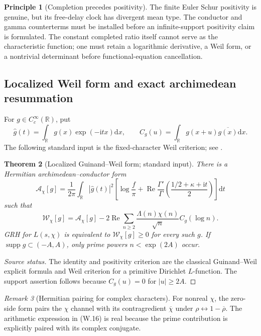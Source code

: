 \documentclass[11pt]{article}
\newtheorem{theorem}{Theorem}[section]
\theoremstyle{definition}
\newtheorem{principle}[theorem]{Principle}
\theoremstyle{remark}
\newtheorem{remark}[theorem]{Remark}
\newcommand{\R}{\mathbb R}
\newcommand{\supp}{\operatorname{supp}}
\newcommand{\dd}{\mathrm d}
\begin{document}
\begin{principle}[Completion precedes positivity]
The finite Euler Schur positivity is genuine, but its free-delay clock has
divergent mean type.  The conductor and gamma counterterms must be installed
before an infinite-support positivity claim is formulated.  The constant
completed ratio itself cannot serve as the characteristic function; one must
retain a logarithmic derivative, a Weil form, or a nontrivial determinant
before functional-equation cancellation.
\end{principle}

\subsection{Localized Weil form and exact archimedean resummation}

For $g\in C_c^\infty(\R)$, put
\[
 \widehat g(t)=\int_\R g(x)\exp(-\mathrm itx)\dd x,
 \qquad
 C_g(u)=\int_\R g(x+u)\overline{g(x)}\dd x.
\]
The following standard input is the fixed-character Weil criterion; see
\cite{Bombieri2000,Lagarias2004}.

\begin{theorem}[Localized Guinand--Weil form; standard input]
\label{thm:weil-explicit-form}
There is a Hermitian archimedean--conductor form
\[
 \mathcal A_\chi[g]
 =\frac1{2\pi}\int_\R|\widehat g(t)|^2
 \left[
  \log\frac f\pi
  +\operatorname{Re}\frac{\Gamma'}{\Gamma}
   \!\left(\frac{1/2+\kappa+\mathrm it}{2}\right)
 \right]\dd t
 \tag{W.15}
\]
such that
\[
 \boxed{
 \mathcal W_\chi[g]
 =\mathcal A_\chi[g]
 -2\operatorname{Re}\sum_{n\ge2}
  \frac{\Lambda(n)\chi(n)}{\sqrt n}C_g(\log n).}
 \tag{W.16}
\]
GRH for $L(s,\chi)$ is equivalent to
$\mathcal W_\chi[g]\ge0$ for every such $g$.  If
$\supp g\subset(-A,A)$, only prime powers $n<\exp(2A)$ occur.
\end{theorem}

\begin{proof}[Source status]
The identity and positivity criterion are the classical Guinand--Weil
explicit formula and Weil criterion for a primitive Dirichlet $L$-function.
The support assertion follows because $C_g(u)=0$ for $|u|\ge2A$.
\end{proof}

\begin{remark}[Hermitian pairing for complex characters]
For nonreal $\chi$, the zero-side form pairs the $\chi$ channel with its
contragredient $\overline\chi$ under
$\rho\leftrightarrow1-\overline\rho$.  The arithmetic expression in
\textup{(W.16)} is real because the prime contribution is explicitly paired
with its complex conjugate.
\end{remark}
\end{document}
